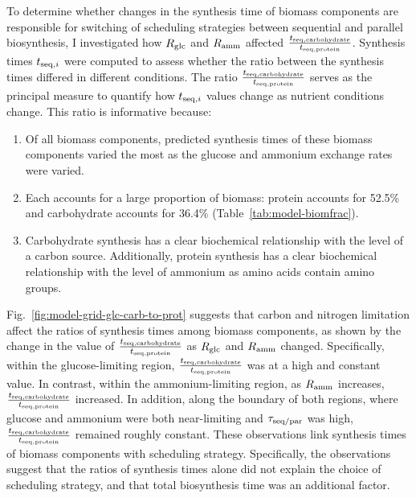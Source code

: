 To determine whether changes in the synthesis time of biomass components are responsible for switching of scheduling strategies between sequential and parallel biosynthesis, I investigated how $R_{\mathrm{glc}}$ and $R_{\mathrm{amm}}$ affected $\frac{t_{\mathrm{seq},\mathrm{carbohydrate}}}{t_{\mathrm{seq},\mathrm{protein}}}$.
Synthesis times $t_{\mathrm{seq},i}$ were computed to assess whether the ratio between the synthesis times differed in different conditions.
The ratio $\frac{t_{\mathrm{seq},\mathrm{carbohydrate}}}{t_{\mathrm{seq},\mathrm{protein}}}$ serves as the principal measure to quantify how $t_{\mathrm{seq},i}$ values change as nutrient conditions change.
This ratio is informative because:
\begin{enumerate}
  \item Of all biomass components, predicted synthesis times of these biomass components varied the most as the glucose and ammonium exchange rates were varied.
  \item Each accounts for a large proportion of biomass: protein accounts for 52.5\% and carbohydrate accounts for 36.4\% (Table~\ref{tab:model-biomfrac}).
  \item Carbohydrate synthesis has a clear biochemical relationship with the level of a carbon source.
        Additionally, protein synthesis has a clear biochemical relationship with the level of ammonium as amino acids contain amino groups.
\end{enumerate}



Fig.\ \ref{fig:model-grid-glc-carb-to-prot} suggests that carbon and nitrogen limitation affect the ratios of synthesis times among biomass components, as shown by the change in the value of $\frac{t_{\mathrm{seq},\mathrm{carbohydrate}}}{t_{\mathrm{seq},\mathrm{protein}}}$ as $R_{\mathrm{glc}}$ and $R_{\mathrm{amm}}$ changed.
Specifically, within the glucose-limiting region, $\frac{t_{\mathrm{seq},\mathrm{carbohydrate}}}{t_{\mathrm{seq},\mathrm{protein}}}$ was at a high and constant value.
In contrast, within the ammonium-limiting region, as $R_{\mathrm{amm}}$ increases, $\frac{t_{\mathrm{seq},\mathrm{carbohydrate}}}{t_{\mathrm{seq},\mathrm{protein}}}$ increased.
In addition, along the boundary of both regions, where glucose and ammonium were both near-limiting and $\tau_{\mathrm{seq}/\mathrm{par}}$ was high, $\frac{t_{\mathrm{seq},\mathrm{carbohydrate}}}{t_{\mathrm{seq},\mathrm{protein}}}$ remained roughly constant.
These observations link synthesis times of biomass components with scheduling strategy.
Specifically, the observations suggest that the ratios of synthesis times alone did not explain the choice of scheduling strategy, and that total biosynthesis time was an additional factor.


